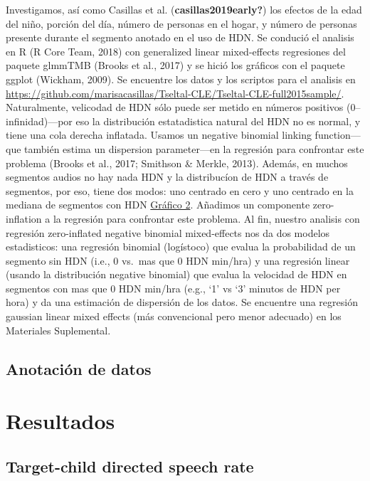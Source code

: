 \documentclass[
  english,
  ,man,floatsintext]{apa6}
\begin{document}
Investigamos, así como Casillas et al. (\textbf{casillas2019early?}) los efectos de la edad del niño, porción del día, número de personas en el hogar, y número de personas presente durante el segmento anotado en el uso de HDN. Se condució el analisis en R (R Core Team, 2018) con generalized linear mixed-effects regresiones del paquete glmmTMB (Brooks et al., 2017) y se hició los gráficos con el paquete ggplot (Wickham, 2009). Se encuentre los datos y los scriptos para el analisis en \url{https://github.com/marisacasillas/Tseltal-CLE/Tseltal-CLE-full2015sample/}. Naturalmente, velicodad de HDN sólo puede ser metido en números positivos (0--infinidad)---por eso la distribución estatadistica natural del HDN no es normal, y tiene una cola derecha inflatada. Usamos un negative binomial linking function---que también estima un dispersion parameter---en la regresión para confrontar este problema (Brooks et al., 2017; Smithson \& Merkle, 2013). Además, en muchos segmentos audios no hay nada HDN y la distribucíon de HDN a través de segmentos, por eso, tiene dos modos: uno centrado en cero y uno centrado en la mediana de segmentos con HDN \protect\hyperlink{fig2}{Gráfico 2}. Añadimos un componente zero-inflation a la regresión para confrontar este problema. Al fin, nuestro analisis con regresión zero-inflated negative binomial mixed-effects nos da dos modelos estadisticos: una regresión binomial (logístoco) que evalua la probabilidad de un segmento sin HDN (i.e., 0 vs.~mas que 0 HDN min/hra) y una regresión linear (usando la distribución negative binomial) que evalua la velocidad de HDN en segmentos con mas que 0 HDN min/hra (e.g., `1' vs `3' minutos de HDN per hora) y da una estimación de dispersión de los datos. Se encuentre una regresión gaussian linear mixed effects (más convencional pero menor adecuado) en los Materiales Suplemental.

\hypertarget{anotaciuxf3n-de-datos}{%
\subsection{Anotación de datos}\label{anotaciuxf3n-de-datos}}

\hypertarget{resultados}{%
\section{Resultados}\label{resultados}}

\hypertarget{target-child-directed-speech-rate}{%
\subsection{Target-child directed speech rate}\label{target-child-directed-speech-rate}}
\end{document}
